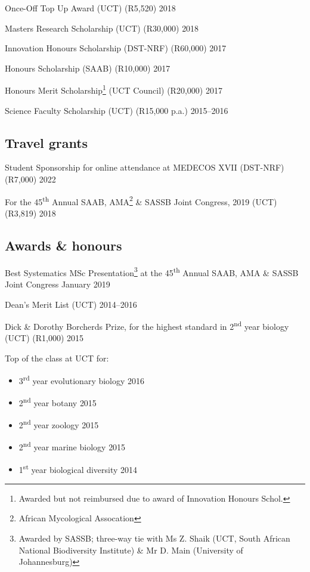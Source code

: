 \documentclass[10pt]{article}
\begin{document}
Once-Off Top Up Award (UCT) (R5,520)                        \hfill {\small 2018}

Masters Research Scholarship (UCT) (R30,000)                \hfill {\small 2018}

Innovation Honours Scholarship (DST-NRF) (R60,000)          \hfill {\small 2017}

Honours Scholarship (SAAB) (R10,000)                        \hfill {\small 2017}

Honours Merit Scholarship\footnote{Awarded but not reimbursed due to award of 
Innovation Honours Schol.} (UCT Council) (R20,000)          \hfill {\small 2017}

Science Faculty Scholarship (UCT) (R15,000 p.a.)      \hfill {\small 2015--2016}

\subsection*{Travel grants}

Student Sponsorship for online attendance at MEDECOS XVII (DST-NRF) (R7,000)
                                                            \hfill {\small 2022}

For the 45\textsuperscript{th} Annual SAAB, AMA\footnote{African Mycological
Assocation} \& SASSB Joint Congress, 2019 (UCT) (R3,819)    \hfill {\small 2018}

\subsection*{Awards \& honours}

Best Systematics MSc Presentation\footnote{Awarded by SASSB; three-way tie with 
Ms Z. Shaik (UCT, South African National Biodiversity Institute) \& Mr D. Main
(University of Johannesburg)} at the 45\textsuperscript{th} Annual SAAB, AMA \&
SASSB Joint Congress                                \hfill {\small January 2019}

Dean's Merit List (UCT)                               \hfill {\small 2014--2016}

Dick \& Dorothy Borcherds Prize, for the highest standard in 
2\textsuperscript{nd} year biology (UCT) (R1,000)           \hfill {\small 2015}

Top of the class at UCT for:

\begin{itemize}[noitemsep, nolistsep]
  \item 3\textsuperscript{rd} year evolutionary biology     \hfill {\small 2016}
  \item 2\textsuperscript{nd} year botany                   \hfill {\small 2015}
  \item 2\textsuperscript{nd} year zoology                  \hfill {\small 2015}
  \item 2\textsuperscript{nd} year marine biology           \hfill {\small 2015}
  \item 1\textsuperscript{st} year biological diversity     \hfill {\small 2014}
\end{itemize}
\end{document}
